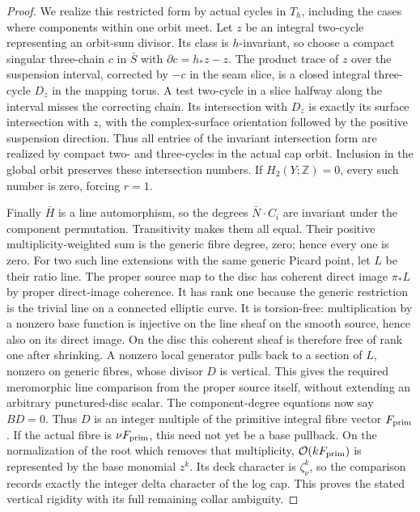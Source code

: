 \begin{proof}
We realize this restricted form by actual cycles in \(T_h\),
including the cases where components within one orbit meet.
Let \(z\) be an integral two-cycle representing an orbit-sum
divisor.  Its class is \(h\)-invariant, so choose a compact
singular three-chain \(c\) in \(\bar S\) with
\(\partial c=h_*z-z\).  The product trace of \(z\)
over the suspension interval, corrected by \(-c\) in the
seam slice, is a closed integral three-cycle \(D_z\) in the
mapping torus.  A test two-cycle in a slice halfway along the
interval misses the correcting chain.  Its intersection with
\(D_z\) is exactly its surface intersection with \(z\),
with the complex-surface orientation followed by the positive
suspension direction.  Thus all entries of the invariant
intersection form are realized by compact two- and three-cycles
in the actual cap orbit.  Inclusion in the global orbit preserves
these intersection numbers.  If \(H_2(Y;\mathbb Z)=0\),
every such number is zero, forcing \(r=1\).

Finally \(\bar H\) is a line automorphism, so the degrees
\(\bar N\cdot C_i\) are invariant under the component
permutation.  Transitivity makes them all equal.  Their positive
multiplicity-weighted sum is the generic fibre degree, zero;
hence every one is zero.  For two such line extensions with the
same generic Picard point, let \(L\) be their ratio line.
The proper source map to the disc has coherent direct image
\(\pi_*L\) by proper direct-image coherence.  It has rank
one because the generic restriction is the trivial line on a
connected elliptic curve.  It is torsion-free: multiplication
by a nonzero base function is injective on the line sheaf on
the smooth source, hence also on its direct image.  On the
disc this coherent sheaf is therefore free of rank one after
shrinking.  A nonzero local generator pulls back to a section
of \(L\), nonzero on generic fibres, whose divisor \(D\)
is vertical.  This gives the required meromorphic line
comparison from the proper source itself, without extending
an arbitrary punctured-disc scalar.  The component-degree
equations now say \(BD=0\).
Thus \(D\) is an integer multiple of the primitive integral
fibre vector \(F_{\rm prim}\).  If the actual fibre is
\(\nu F_{\rm prim}\), this need not yet be a base pullback.
On the normalization of the root which removes that multiplicity,
\(\mathcal O(kF_{\rm prim})\) is represented by the
base monomial \(z^k\).  Its deck character is
\(\zeta_\nu^k\), so the comparison records exactly the
integer delta character of the log cap.  This proves the stated
vertical rigidity with its full remaining collar ambiguity.
\end{proof}

